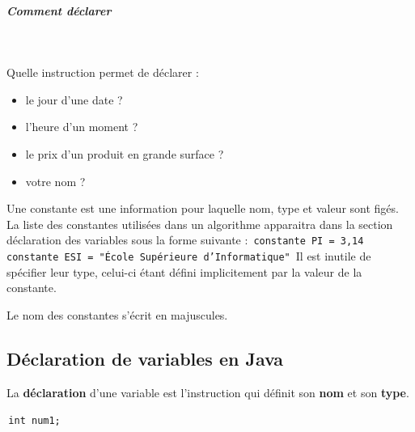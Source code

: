 \documentclass[11pt,a4paper]{article}
\begin{document}
            \par
        
			
		\subparagraph{Comment d\'eclarer} 
		
                \textcolor{white}{.} \par
            
							  Quelle instruction permet de d\'eclarer :
							
					\begin{itemize}
				
			\item le jour d'une date ? \textcolor{gray}{\underline{\hspace*{10em}}} 
			\item l'heure d'un moment ?  \textcolor{gray}{\underline{\hspace*{10em}}} 
			\item le prix d'un produit en grande surface ? \textcolor{gray}{\underline{\hspace*{10em}}} 
			\item votre nom ?  \textcolor{gray}{\underline{\hspace*{10em}}} 
					\end{itemize}
				
				  Une constante est une information pour laquelle nom, type et valeur sont fig\'es.
          La liste des constantes utilis\'ees dans un algorithme apparaitra dans la section d\'eclaration des variables sous la forme suivante : 
          \,\verb|constante PI = 3,14|\,\,\verb|constante ESI = "École Supérieure d’Informatique"|\,
          Il est inutile de sp\'ecifier leur type, celui-ci \'etant d\'efini implicitement par la valeur de la constante.
        
            \par
        
          Le nom des constantes s'\'ecrit en majuscules.
        
            \par
        \subsection{D\'eclaration de variables en Java}
          La \textbf{d\'eclaration} d'une variable est l'instruction qui d\'efinit son \textbf{nom} 
          et son \textbf{type}.
        
            \par
        \,\verb|int num1;|\,
            \par
        
\end{document}
